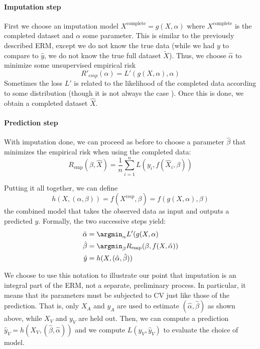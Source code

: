 			\paragraph{Imputation step}
First we choose an imputation model $X^{\text{complete}} = g(X, \alpha)$ where $X^{\text{complete}}$ is the completed dataset and $\alpha$ some parameter. This is similar to the previously described ERM, except we do not know the true data (while we had $y$ to compare to $\hat{y}$, we do not know the true full dataset $\tilde{X}$). Thus, we choose $\hat{\alpha}$ to minimize some unsupervised empirical risk
$$R'_{emp}(\alpha)=L'(g(X, \alpha), \alpha)$$
Sometimes the loss $L'$ is related to the likelihood of the completed data according to some distribution\cite{ref_amelia} (though it is not always the case \cite{stekhoven2015missforest}). Once this is done, we obtain a completed dataset $\hat{X}$.

			\paragraph{Prediction step}
With imputation done, we can proceed as before to choose a parameter $\hat{\beta}$ that minimizes the empirical risk when using the completed data:
	$$ R_{\text{emp}}(\beta, \hat{X}) = \frac{1}{n} \sum\limits_{i=1}^n L(y_i, f(\hat{X}_i, \beta))$$
	
Putting it all together, we can define 
$$ h(X, (\alpha, \beta)) = f(X^{imp}, \beta) = f( g(X, \alpha), \beta) $$
the combined model that takes the observed data as input and outputs a predicted $y$. Formally, the two successive steps yield:
\begin{align*}
\hat{\alpha} &= \argmin_{\alpha} L'(g(X,\alpha) \\
\hat{\beta} &= \argmin_{\beta} R_{\text{emp}}(\beta,f(X,\hat{\alpha})) \\
\hat{y} &= h(X, (\hat{\alpha}, \hat{\beta}))
\end{align*}

We choose to use this notation to illustrate our point that imputation is an integral part of the ERM, not a separate, preliminary process. In particular, it means that its parameters must be subjected to CV just like those of the prediction. That is, only $X_A$ and $y_A$ are used to estimate $(\hat{\alpha}, \hat{\beta})$ as shown above, while $X_V$ and $y_V$ are held out. Then, we can compute a prediction $\hat{y}_V = h(X_V, (\hat{\beta}, \hat{\alpha}))$ and we compute $L(y_V, \hat{y}_V)$ to evaluate the choice of model.

